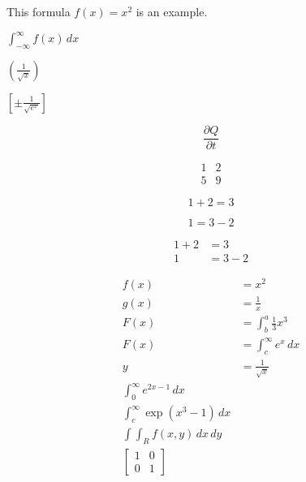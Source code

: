 \documentclass{article}
\begin{document}
This formula $f(x) = x^2$ is an example. \par             %
$ \int^\infty_{-\infty} f(x)\,dx$   \par
$ \left(\frac{1}{\sqrt{x}}\right)$  \par
$ \left[\pm\frac{1}{\sqrt{e^x}}\right]$


\begin{equation}
\frac{\partial Q}{\partial t}
\end{equation}


\begin{equation}
\begin{matrix}
1 & 2\\
5 & 9
\end{matrix}
\end{equation}


\begin{equation*}
  1 + 2 = 3 
\end{equation*}

\begin{equation*}
  1 = 3 - 2
\end{equation*}

\begin{align*}
  1 + 2 &= 3\\
  1 &= 3 - 2
\end{align*}


\begin{align*}
  f(x) &= x^2\\
  g(x) &= \frac{1}{x}\\
  F(x) &= \int^a_b \frac{1}{3}x^3\\
  F(x) &= \int^\infty_c e^x\,dx\\                %
  y &= \frac{1}{\sqrt{x}}\\
  \int^\infty_0 e^{2x-1}\,dx\\
  \int^\infty_c \exp{(x^3-1)}\,dx\\
  \int \!\!\! \int_R f(x,y)\,dx\,dy\\
\left[
\begin{matrix}
1 & 0\\
0 & 1
\end{matrix}
\right]
\end{align*}
\end{document}
